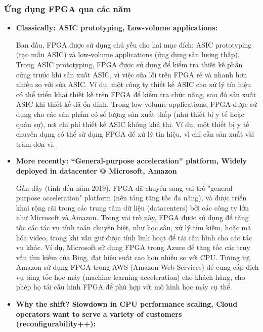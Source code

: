 \documentclass[a4paper]{article}
\begin{document}
\subsubsection{Ứng dụng FPGA qua các năm}
\begin{itemize} [label=-]
    \item \textbf{Classically: ASIC prototyping, Low-volume applications:} \par
    Ban đầu, FPGA được sử dụng chủ yếu cho hai mục đích: ASIC prototyping (tạo mẫu ASIC) và low-volume applications (ứng dụng sản lượng thấp). Trong ASIC prototyping, FPGA được sử dụng để kiểm tra thiết kế phần cứng trước khi sản xuất ASIC, vì việc sửa lỗi trên FPGA rẻ và nhanh hơn nhiều so với sửa ASIC. Ví dụ, một công ty thiết kế ASIC cho xử lý tín hiệu có thể triển khai thiết kế trên FPGA để kiểm tra chức năng, sau đó sản xuất ASIC khi thiết kế đã ổn định. Trong low-volume applications, FPGA được sử dụng cho các sản phẩm có số lượng sản xuất thấp (như thiết bị y tế hoặc quân sự), nơi chi phí thiết kế ASIC không khả thi. Ví dụ, một thiết bị y tế chuyên dụng có thể sử dụng FPGA để xử lý tín hiệu, vì chỉ cần sản xuất vài trăm đơn vị.
    \item \textbf{More recently: “General-purpose acceleration” platform, Widely deployed in datacenter @ Microsoft, Amazon} \par
    Gần đây (tính đến năm 2019), FPGA đã chuyển sang vai trò "general-purpose acceleration" platform (nền tảng tăng tốc đa năng), và được triển khai rộng rãi trong các trung tâm dữ liệu (datacenters) bởi các công ty lớn như Microsoft và Amazon. Trong vai trò này, FPGA được sử dụng để tăng tốc các tác vụ tính toán chuyên biệt, như học sâu, xử lý tìm kiếm, hoặc mã hóa video, trong khi vẫn giữ được tính linh hoạt để tái cấu hình cho các tác vụ khác. Ví dụ, Microsoft sử dụng FPGA trong Azure để tăng tốc các truy vấn tìm kiếm của Bing, đạt hiệu suất cao hơn nhiều so với CPU. Tương tự, Amazon sử dụng FPGA trong AWS (Amazon Web Services) để cung cấp dịch vụ tăng tốc học máy (machine learning acceleration) cho khách hàng, cho phép họ tái cấu hình FPGA để phù hợp với mô hình học máy cụ thể.
    \item \textbf{Why the shift? Slowdown in CPU performance scaling, Cloud operators want to serve a variety of customers (reconfigurability++):} \par

\end{itemize}
\end{document}
